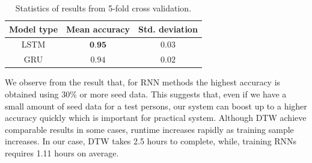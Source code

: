 \documentclass[10pt,twocolumn,letterpaper]{article}
\begin{document}
\begin{table}[h]
	\begin{center}
		\begin{tabular}{|c|c|c|}
			\hline
			Model type & Mean accuracy & Std. deviation\\
			\hline\hline
			LSTM & $\textbf{0.95}$ & $0.03$\\
			\hline
			GRU & $0.94$ & $0.02$ \\
			\hline
		\end{tabular}
	\end{center}
	\caption{Statistics of results from 5-fold cross validation.}
	\label{table:result_conv}
\end{table}
%		
We observe from the result that, for RNN methods the highest accuracy is obtained using 30\% or more seed data. This suggests that, even if we have a small amount of seed data for a test persons, our system can boost up to a higher accuracy quickly which is important for practical system. 
Although DTW achieve comparable results in some cases, runtime increases rapidly as training sample increases. In our case, DTW takes 2.5 hours to complete, while, training RNNs requires 1.11 hours on average.
\end{document}

